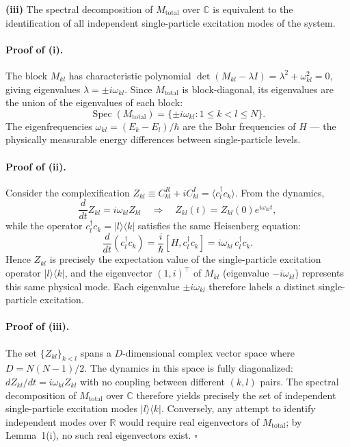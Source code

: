 \documentclass[aps,pra,preprint,groupedaddress,amsmath,amssymb,floatfix]{revtex4-2}
\begin{document}
\textbf{(iii)} The spectral decomposition of $M_{\text{total}}$ over $\mathbb{C}$ is equivalent to the identification of all independent single-particle excitation modes of the system.

\paragraph{Proof of (i).} The block $M_{kl}$ has characteristic polynomial $\det(M_{kl} - \lambda I) = \lambda^2 + \omega_{kl}^2 = 0$, giving eigenvalues $\lambda = \pm i\omega_{kl}$. Since $M_{\text{total}}$ is block-diagonal, its eigenvalues are the union of the eigenvalues of each block:
\[
\operatorname{Spec}(M_{\text{total}}) = \{\pm i\omega_{kl} : 1 \leq k < l \leq N\}.
\]
The eigenfrequencies $\omega_{kl} = (E_k - E_l)/\hbar$ are the Bohr frequencies of $H$ --- the physically measurable energy differences between single-particle levels.

\paragraph{Proof of (ii).} Consider the complexification $Z_{kl} \equiv C^R_{kl} + i C^I_{kl} = \langle c^\dagger_l c_k \rangle$. From the dynamics,
\begin{equation}
\frac{d}{dt} Z_{kl} = i\omega_{kl} Z_{kl} \quad\Longrightarrow\quad Z_{kl}(t) = Z_{kl}(0) e^{i\omega_{kl} t},
\label{eq:lemma3_Zevol}
\end{equation}
while the operator $c^\dagger_l c_k = |l\rangle\langle k|$ satisfies the same Heisenberg equation:
\begin{equation}
\frac{d}{dt} (c^\dagger_l c_k) = \frac{i}{\hbar}[H, c^\dagger_l c_k] = i\omega_{kl} \, c^\dagger_l c_k.
\label{eq:lemma3_opevol}
\end{equation}
Hence $Z_{kl}$ is precisely the expectation value of the single-particle excitation operator $|l\rangle\langle k|$, and the eigenvector $(1,i)^\top$ of $M_{kl}$ (eigenvalue $-i\omega_{kl}$) represents this same physical mode. Each eigenvalue $\pm i\omega_{kl}$ therefore labels a distinct single-particle excitation.

\paragraph{Proof of (iii).} The set $\{Z_{kl}\}_{k<l}$ spans a $D$-dimensional complex vector space where $D = N(N-1)/2$. The dynamics in this space is fully diagonalized: $dZ_{kl}/dt = i\omega_{kl} Z_{kl}$ with no coupling between different $(k,l)$ pairs. The spectral decomposition of $M_{\text{total}}$ over $\mathbb{C}$ therefore yields precisely the set of independent single-particle excitation modes $|l\rangle\langle k|$. Conversely, any attempt to identify independent modes over $\mathbb{R}$ would require real eigenvectors of $M_{\text{total}}$; by Lemma~1(i), no such real eigenvectors exist. $\square$
\end{document}

